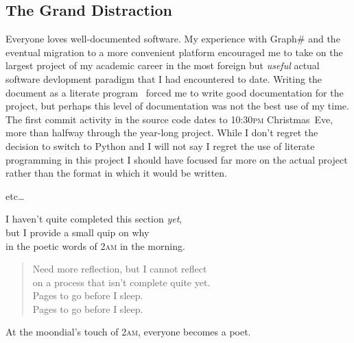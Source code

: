 \subsection{The Grand Distraction}
Everyone loves well-documented software.
My experience with Graph\# \Dash and the eventual migration to a more convenient platform \Dash
  encouraged me to take on the largest project of my academic career in
  the most foreign \Dash but \emph{useful} \Dash actual software devlopment paradigm
  that I had encountered to date.
Writing the document as a literate program~\autocite{knuth:lit-prog}
  forced me to write good documentation for the project,
  but perhaps this level of documentation was not the best use of my time.
The first commit activity in the source code dates to 10:30\textsc{pm} Christmas~Eve,
  more than halfway through the year-long project.
While I don't regret the decision to switch to Python \Dash
  and I will not say I regret the use of literate programming in this project \Dash
  I should have focused far more on the actual project
  rather than the format in which it would be written.

etc\dots



\begin{draftvspace}{1in}
  I haven't quite completed this section \emph{yet}, \\
    but I provide a small quip on why \\
    in the poetic words of 2\textsc{am} in the morning.
  \begin{verse}
    Need more reflection, but I cannot reflect \\
    on a process that isn't complete quite yet. \\
    Pages to go before I sleep. \\
    Pages to go before I sleep. \\
  \end{verse}

  \begin{displayquote}[Plato]
    At the moondial's touch of 2\textsc{am}, everyone becomes a poet.
  \end{displayquote}
\end{draftvspace}


